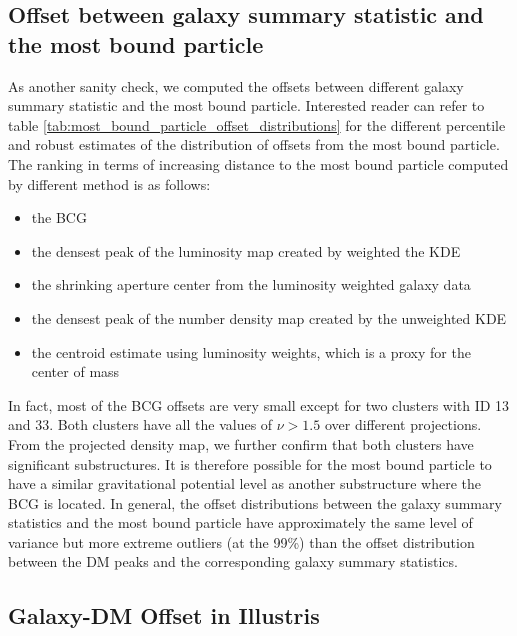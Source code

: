 \subsection{Offset between galaxy summary statistic and the most bound particle}
As another sanity check, we computed the offsets between different galaxy summary
statistic and the most bound particle. 
Interested reader can refer to table
\ref{tab:most_bound_particle_offset_distributions} for the different
percentile and robust estimates of the distribution of offsets from the most bound 
particle. 
The ranking in terms of increasing distance 
to the most bound particle computed by different method is as follows:
\begin{itemize}
	\item the BCG 
	\item the densest peak of the luminosity map created by weighted the KDE 
		\item the shrinking aperture center from the luminosity weighted galaxy data
		\item the densest peak of the number density map created by the unweighted KDE 
		\item the centroid estimate using luminosity weights, which is a proxy for the
			center of mass
\end{itemize}

In fact, most of the BCG offsets are very small except for two clusters with ID 13
and 33. Both clusters have all the values  of $\nu > 1.5 $ over different projections. 
From the projected density map, we further confirm that
both clusters have significant substructures. It is therefore possible for the
most bound particle to have a similar gravitational potential level as another 
substructure where the BCG is located. 
In general, the offset distributions between the galaxy summary statistics and
the most bound particle have approximately the same level of variance but more
extreme outliers (at the 99\%) than the
offset distribution between the DM peaks and the corresponding galaxy summary
statistics.

\subsection{Galaxy-DM Offset in Illustris}
